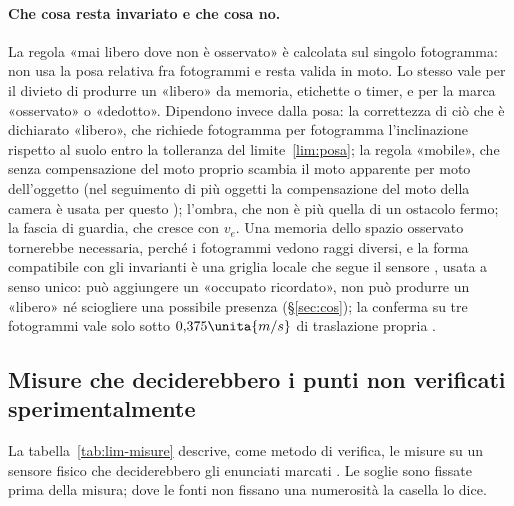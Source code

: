 \paragraph{Che cosa resta invariato e che cosa no.} La regola «mai libero dove non è osservato» è calcolata sul singolo fotogramma: non usa la posa relativa fra fotogrammi e resta valida in moto. Lo stesso vale per il divieto di produrre un «libero» da memoria, etichette o timer, e per la marca «osservato» o «dedotto». Dipendono invece dalla posa: la correttezza di ciò che è dichiarato «libero», che richiede fotogramma per fotogramma l'inclinazione rispetto al suolo entro la tolleranza del limite~\ref{lim:posa}; la regola «mobile», che senza compensazione del moto proprio scambia il moto apparente per moto dell'oggetto (nel seguimento di più oggetti la compensazione del moto della camera è usata per questo \cite{aharon2022}); l'ombra, che non è più quella di un ostacolo fermo; la fascia di guardia, che cresce con $v_e$. Una memoria dello spazio osservato tornerebbe necessaria, perché i fotogrammi vedono raggi diversi, e la forma compatibile con gli invarianti è una griglia locale che segue il sensore \cite{usenko2017}, usata a senso unico: può aggiungere un «occupato ricordato», non può produrre un «libero» né sciogliere una possibile presenza (\S\ref{sec:cos}); la conferma su tre fotogrammi vale solo sotto $0{,}375\unita{m/s}$ di traslazione propria .

\subsection{Misure che deciderebbero i punti non verificati sperimentalmente}\label{sec:lim-misure}

La tabella~\ref{tab:lim-misure} descrive, come metodo di verifica, le misure su un sensore fisico che deciderebbero gli enunciati marcati . Le soglie sono fissate prima della misura; dove le fonti non fissano una numerosità la casella lo dice.

